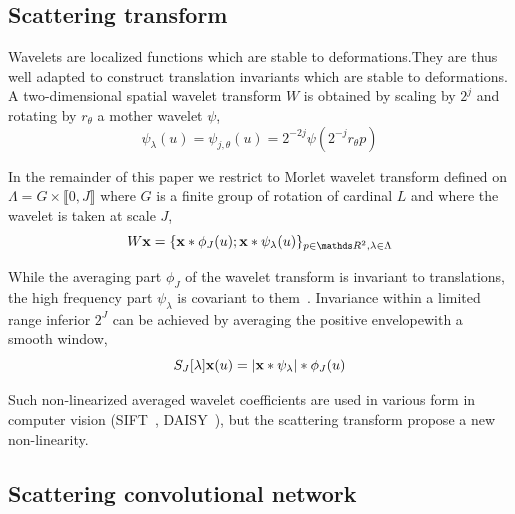 \documentclass{article}
\begin{document}
  \subsection{Scattering transform}
    \label{subsec:SCN/ST}
    
    Wavelets are localized functions which are stable to deformations.They are thus well adapted to construct translation invariants which are stable to deformations. A two-dimensional spatial wavelet transform $W$ is obtained by scaling by $2^{j}$ and rotating by $r_{\theta}$ a mother wavelet $\psi$,
    \vspace{-5pt}
    \begin{equation}
      \label{eq:multi-scale directional wavelet}
      \psi_{\lambda}(u) = \psi_{j,\theta}(u) = 2^{-2j} \psi(2^{-j}r_{\theta}p)
    \end{equation}
    
    In the remainder of this paper we restrict to Morlet wavelet transform defined on $\Lambda = G \times \llbracket 0,J \rrbracket$ where $G$ is a finite group of rotation of cardinal $L$ and where the wavelet is taken at scale $J$,
    \vspace{-5pt}
    \begin{equation}
      \label{eq:wavelet transform}
      W\bfx = \{ \bfx \ast \phi_{J}(u); \bfx \ast \psi_{\lambda}(u) \}_{p\in\dsR^{2},\lambda \in \Lambda}
    \end{equation}
    
    While the averaging part $\phi_{J}$ of the wavelet transform is invariant to translations, the high frequency part $\psi_{\lambda}$ is covariant to them~\cite{mallat}. Invariance within a limited range inferior $2^{J}$ can be achieved by averaging the positive envelopewith a smooth window,
    \vspace{-5pt}
    \begin{equation}
      \label{eq:Scattering transform}
      S_{J}[\lambda]{\bf x}(u) = \left| {\bf x} \ast \psi_{\lambda} \right| \ast \phi_{J}(u)
    \end{equation}
    
    Such non-linearized averaged wavelet coefficients are used in various form in computer vision (SIFT~\cite{}, DAISY~\cite{}), but the scattering transform propose a new non-linearity.
  
  \subsection{Scattering convolutional network}
    \label{subsec:SCN/SCN}
    
\end{document}

